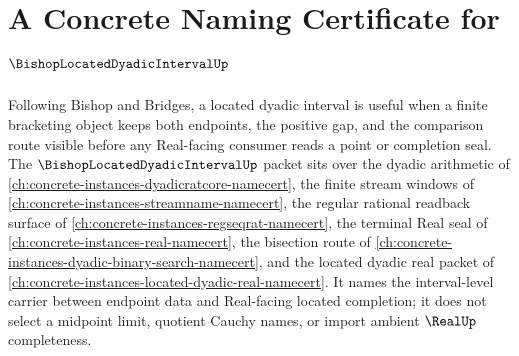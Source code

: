 \chapter{A Concrete Naming Certificate for $\BishopLocatedDyadicIntervalUp$}
\label{ch:concrete-instances-bishop-located-dyadic-interval-namecert}

Following Bishop and Bridges, a located dyadic interval is useful when a finite bracketing object keeps both endpoints, the positive gap, and the comparison route visible before any Real-facing consumer reads a point or completion seal. The $\BishopLocatedDyadicIntervalUp$ packet sits over the dyadic arithmetic of \autoref{ch:concrete-instances-dyadicratcore-namecert}, the finite stream windows of \autoref{ch:concrete-instances-streamname-namecert}, the regular rational readback surface of \autoref{ch:concrete-instances-regseqrat-namecert}, the terminal Real seal of \autoref{ch:concrete-instances-real-namecert}, the bisection route of \autoref{ch:concrete-instances-dyadic-binary-search-namecert}, and the located dyadic real packet of \autoref{ch:concrete-instances-located-dyadic-real-namecert}. It names the interval-level carrier between endpoint data and Real-facing located completion; it does not select a midpoint limit, quotient Cauchy names, or import ambient $\RealUp$ completeness.

